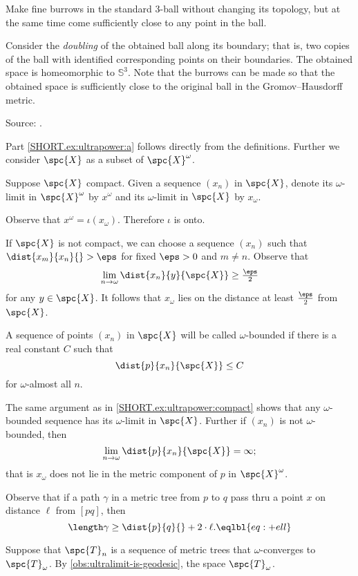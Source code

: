 Make fine burrows in the standard 3-ball without changing its topology,
but at the same time come sufficiently close to any point in the ball.

Consider the \emph{doubling} of the obtained ball along its boundary;
that is, two copies of the ball with identified corresponding points on their boundaries.
The obtained space is homeomorphic to $\mathbb{S}^3$.
Note that the burrows can be made 
so that the obtained space is sufficiently close to the original ball 
in the Gromov--Hausdorff metric.\qeds

Source: \cite[Exercises 7.5.13 and 7.5.17]{burago-burago-ivanov}. 


Part \ref{SHORT.ex:ultrapower:a} follows directly from the definitions.
Further we consider $\spc{X}$ as a subset of $\spc{X}^\omega$.

Suppose $\spc{X}$ compact.
Given a sequence $(x_n)$ in $\spc{X}$, denote its $\omega$-limit in $\spc{X}^\omega$ by $x^\omega$ and its $\omega$-limit in $\spc{X}$ by $x_\omega$.

Observe that $x^\omega=\iota(x_\omega)$.
Therefore $\iota$ is onto.

If $\spc{X}$ is not compact, we can choose a sequence $(x_n)$ such that $\dist{x_m}{x_n}{}>\eps$ for fixed $\eps>0$ and $m\ne n$.
Observe that
\[\lim_{n\to\omega}\dist{x_n}{y}{\spc{X}}\ge \tfrac\eps2\]
for any $y\in\spc{X}$.
It follows that $x_\omega$ lies on the distance at least $\tfrac\eps2$ from $\spc{X}$.

A sequence of points $(x_n)$ in $\spc{X}$ will be called $\omega$-bounded if there is a real constant $C$ such that
\[\dist{p}{x_n}{\spc{X}}\le C\] 
for $\omega$-almost all $n$.

The same argument as in \ref{SHORT.ex:ultrapower:compact} shows that any $\omega$-bounded sequence has its $\omega$-limit in $\spc{X}$.
Further if $(x_n)$ is not  $\omega$-bounded, then 
\[\lim_{n\to\omega}\dist{p}{x_n}{\spc{X}}=\infty;\]
that is $x_\omega$ does not lie in the metric component of $p$ in $\spc{X}^\omega$.

Observe that if a path $\gamma$ in a metric tree from $p$ to $q$ pass thru a point $x$ on distance $\ell$ from $[pq]$, then 
\[\length\gamma\ge \dist{p}{q}{}+2\cdot \ell.\eqlbl{eq:+ell}\]

Suppose that $\spc{T}_n$ is a sequence of metric trees that $\omega$-converges to $\spc{T}_\omega$.
By \ref{obs:ultralimit-is-geodesic}, the space $\spc{T}_\omega$.

